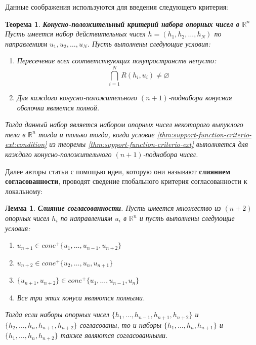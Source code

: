\documentclass[a4paper, 12pt, titlepage]{article}
\theoremstyle{definition}
\theoremstyle{plain}
\newtheorem{SmartTheorem}{Теорема}
\theoremstyle{plain}
\newtheorem{SmartLemma}{Лемма}
\begin{document}
Данные соображения используются для введения следующего критерия:

\begin{SmartTheorem}
 \label{thm:positive-cone-consistency}
 \textbf{Конусно-положительный критерий набора опорных чисел в $\mathbb{R}^{n}$}
 Пусть имеется набор действительных чисел $h = (h_{1}, h_{2}, \ldots, h_{N})$ по
 направлениям $u_{1}, u_{2}, \ldots, u_{N}$. Пусть выполнены следующие
 условия:
 \begin{enumerate}
  \item Пересечение всех соответствующих полупространств непусто:
  \begin{equation}
   \bigcap \limits_{i = 1}^{N} R(h_{i}, u_{i}) \neq \varnothing
  \end{equation}
  \item Для каждого конусно-положительного $(n + 1)$-поднабора конусная оболочка
  является полной.
 \end{enumerate}

 Тогда данный набор является набором опорных чисел некоторого выпуклого тела в
 $\mathbb{R}^{n}$ тогда и только тогда, когда условие
 \ref{thm:support-function-criterio-ext:condition} из теоремы
 \ref{thm:support-function-criterio-ext} выполняется для каждого
 конусно-положительного $(n + 1)$-поднабора чисел.
\end{SmartTheorem}

Далее авторы статьи с помощью идеи, которую они называют \textbf{слиянием
согласованности}, проводят сведение глобального критерия согласованности к
локальному:

\begin{SmartLemma}
 \label{lem:consistency-merging}
 \textbf{Слияние согласованности}.
 Пусть имеется множество из $(n + 2)$ опорных чисел $h_{i}$ по направлениям
 $u_{i}$ в $\mathbb{R}^{n}$ и пусть выполнены следующие условия:

 \begin{enumerate}
  \item $u_{n + 1} \in cone^{+}\{u_{1}, \ldots, u_{n - 1}, u_{n + 2}\}$
  \item $u_{n + 2} \in cone^{+}\{u_{2}, \ldots, u_{n}, u_{n + 1}\}$
  \item $\{u_{n + 1}, u_{n + 2}\} \in cone^{+}\{u_{1}, \ldots, u_{n - 1},
u_{n}\}$
  \item Все три этих конуса являются полными.
 \end{enumerate}

 Тогда если наборы опорных чисел
 $\{h_{1}, \ldots, h_{n - 1}, h_{n + 1}, h_{n + 2}\}$ и
 $\{h_{2}, \ldots, h_{n}, h_{n + 1}, h_{n + 2}\}$ согласованы, то и наборы
 $\{h_{1}, \ldots, h_{n}, h_{n + 1}\}$ и
 $\{h_{1}, \ldots, h_{n}, h_{n + 2}\}$ также являются согласованными.
\end{SmartLemma}
\end{document}
